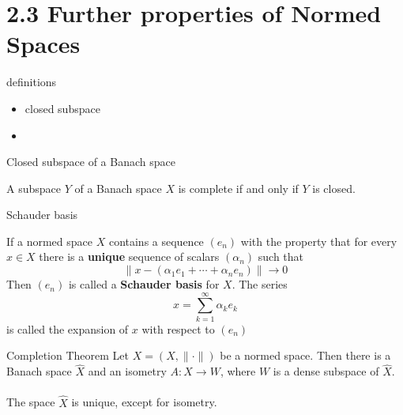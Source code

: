 \section{2.3 Further properties of Normed Spaces}

\begin{frame}{definitions}
\begin{itemize}
    \item closed subspace
    \item 
\end{itemize}
    
\end{frame}


\begin{frame}{Closed subspace of a Banach space}
\begin{theorem}
    A subspace $Y$ of a Banach space $X$ is complete if and only if $Y$ is closed.
\end{theorem}
\end{frame}

\begin{frame}{Schauder basis}
\begin{definition}
    If a normed space $X$ contains a sequence $(e_n)$ with the property that for every $x\in X$ there is a \textbf{unique} sequence of scalars $(\alpha_n)$ such that
    $$
    \|x-(\alpha_1e_1+\cdots+\alpha_n e_n)\| \to 0
    $$
    Then $(e_n)$ is called a \textbf{Schauder basis} for $X$. The series 
    $$
    x = \sum_{k=1}^\infty\alpha_ke_k
    $$
    is called the expansion of $x$ with respect to $(e_n)$
\end{definition}    
\end{frame}

\begin{frame}{Completion Theorem}
    Let $X = (X, \|\cdot\|)$  be a normed space. Then there is a Banach space $\widehat X$ and an isometry $A: X\to W$, where $W$ is a dense subspace of $\widehat X$.\\
    \\
    The space $\widehat X$ is unique, except for isometry.
\end{frame}